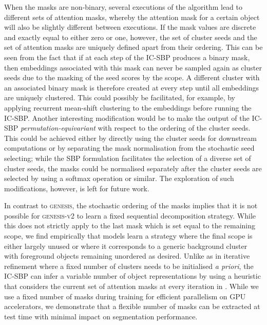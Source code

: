 \documentclass{article}
\begin{document}
When the masks are non-binary, several executions of the algorithm lead to different sets of attention masks, whereby the attention mask for a certain object will also be slightly different between executions.
If the mask values are discrete and exactly equal to either zero or one, however, the set of cluster seeds and the set of attention masks are uniquely defined apart from their ordering.
This can be seen from the fact that if at each step of the IC-SBP produces a binary mask, then embeddings associated with this mask can never be sampled again as cluster seeds due to the masking of the seed scores by the scope.
A different cluster with an associated binary mask is therefore created at every step until all embeddings are uniquely clustered.
This could possibly be facilitated, for example, by applying recurrent mean-shift clustering \cite{kong2018recurrent} to the embeddings before running the IC-SBP.
Another interesting modification would be to make the output of the IC-SBP \emph{permutation-equivariant} with respect to the ordering of the cluster seeds.
This could be achieved either by directly using the cluster seeds for downstream computations or by separating the mask normalisation from the stochastic seed selecting; while the SBP formulation facilitates the selection of a diverse set of cluster seeds, the masks could be normalised separately after the cluster seeds are selected by using a softmax operation or similar.
The exploration of such modifications, however, is left for future work.

In contrast to \textsc{genesis}, the stochastic ordering of the masks implies that it is not possible for \textsc{genesis-v2} to learn a fixed sequential decomposition strategy.
While this does not strictly apply to the last mask which is set equal to the remaining scope, we find empirically that models learn a strategy where the final scope is either largely unused or where it corresponds to a generic background cluster with foreground objects remaining unordered as desired.
Unlike as in iterative refinement where a fixed number of clusters needs to be initialised \emph{a priori}, the IC-SBP can infer a variable number of object representations by using a heuristic that considers the current set of attention masks at every iteration in .
While we use a fixed number of  masks during training for efficient parallelism on GPU accelerators, we demonstrate that a flexible number of masks can be extracted at test time with minimal impact on segmentation performance.
\end{document}

